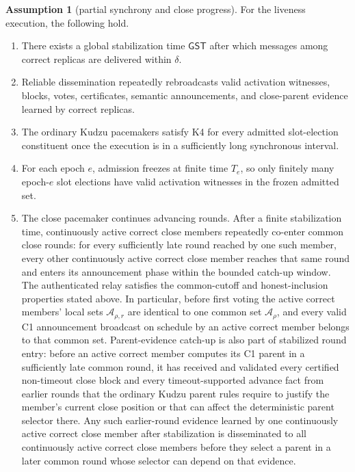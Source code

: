 \documentclass[11pt]{article}
\theoremstyle{definition}
\newtheorem{assumption}[theorem]{Assumption}
\theoremstyle{remark}
\newcommand{\GST}{\mathsf{GST}}
\begin{document}
\begin{assumption}[partial synchrony and close progress]
\label{ass:termination}
For the liveness execution, the following hold.
\begin{enumerate}[label=(\roman*)]
  \item There exists a global stabilization time $\GST$ after which messages among correct replicas are delivered within $\delta$.
  \item Reliable dissemination repeatedly rebroadcasts valid activation witnesses, blocks, votes, certificates, semantic announcements, and close-parent evidence learned by correct replicas.
  \item The ordinary Kudzu pacemakers satisfy K4 for every admitted slot-election constituent once the execution is in a sufficiently long synchronous interval.
  \item For each epoch $e$, admission freezes at finite time $T_e$, so only finitely many epoch-$e$ slot elections have valid activation witnesses in the frozen admitted set.
  \item The close pacemaker continues advancing rounds. After a finite stabilization time, continuously active correct close members repeatedly co-enter common close rounds: for every sufficiently late round reached by one such member, every other continuously active correct close member reaches that same round and enters its announcement phase within the bounded catch-up window. The authenticated relay satisfies the common-cutoff and honest-inclusion properties stated above. In particular, before first voting the active correct members' local sets $\mathcal A_{\rho,r}$ are identical to one common set $\mathcal A_\rho$, and every valid C1 announcement broadcast on schedule by an active correct member belongs to that common set. Parent-evidence catch-up is also part of stabilized round entry: before an active correct member computes its C1 parent in a sufficiently late common round, it has received and validated every certified non-timeout close block and every timeout-supported advance fact from earlier rounds that the ordinary Kudzu parent rules require to justify the member's current close position or that can affect the deterministic parent selector there. Any such earlier-round evidence learned by one continuously active correct close member after stabilization is disseminated to all continuously active correct close members before they select a parent in a later common round whose selector can depend on that evidence.

\end{enumerate}
\end{assumption}
\end{document}
